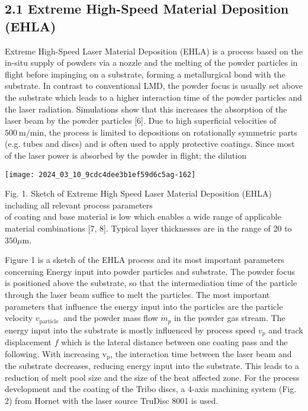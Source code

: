 \documentclass[10pt]{article}
\begin{document}
\subsection*{2.1 Extreme High-Speed Material Deposition (EHLA)}
Extreme High-Speed Laser Material Deposition (EHLA) is a process based on the in-situ supply of powders via a nozzle and the melting of the powder particles in flight before impinging on a substrate, forming a metallurgical bond with the substrate. In contrast to conventional LMD, the powder focus is usually set above the substrate which leads to a higher interaction time of the powder particles and the laser radiation. Simulations show that this increases the absorption of the laser beam by the powder particles [6]. Due to high superficial velocities of $500 \mathrm{~m} / \mathrm{min}$, the process is limited to depositions on rotationally symmetric parts (e.g. tubes and discs) and is often used to apply protective coatings. Since most of the laser power is absorbed by the powder in flight; the dilution

\begin{center}
\texttt{[image: 2024\_03\_10\_9cdc4dee3b1ef59d6c5ag-162]}
\end{center}

Fig. 1. Sketch of Extreme High Speed Laser Material Deposition (EHLA) including all relevant process parameters\\
of coating and base material is low which enables a wide range of applicable material combinations [7, 8]. Typical layer thicknesses are in the range of 20 to $350 \mu \mathrm{m}$.

Figure 1 is a sketch of the EHLA process and its most important parameters concerning Energy input into powder particles and substrate. The powder focus is positioned above the substrate, so that the intermediation time of the particle through the laser beam suffice to melt the particles. The most important parameters that influence the energy input into the particles are the particle velocity $v_{\text {particle }}$ and the powder mass flow $\dot{m}_{p}$ in the powder gas stream. The energy input into the substrate is mostly influenced by process speed $v_{p}$ and track displacement $f$ which is the lateral distance between one coating pass and the following. With increasing $\mathrm{v}_{\mathrm{p}}$, the interaction time between the laser beam and the substrate decreases, reducing energy input into the substrate. This leads to a reduction of melt pool size and the size of the heat affected zone. For the process development and the coating of the Tribo discs, a 4-axis machining system (Fig. 2) from Hornet with the laser source TruDisc 8001 is used.
\end{document}
